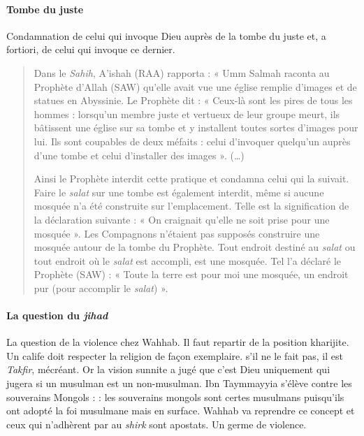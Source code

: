 \paragraph{Tombe du juste}
Condamnation de celui qui invoque Dieu
auprès de la tombe du juste et, a fortiori, de celui qui invoque ce
dernier.
\begin{Ex}
\begin{quote}
Dans le \emph{Sahih}, A'ishah (RAA) rapporta : « Umm Salmah raconta au
Prophète d'Allah (SAW) qu'elle avait vue une église remplie d'images et
de statues en Abyssinie. Le Prophète dit : « Ceux-là sont les pires de
tous les hommes : lorsqu'un membre juste et vertueux de leur groupe
meurt, ils bâtissent une église sur sa tombe et y installent toutes
sortes d'images pour lui. Ils sont coupables de deux méfaits : celui
d'invoquer quelqu'un auprès d'une tombe et celui d'installer des images
». (\ldots)

Ainsi le Prophète interdit cette pratique et condamna celui qui la
suivait. Faire le \emph{salat} sur une tombe est également interdit,
même si aucune mosquée n'a été construite sur l'emplacement. Telle est
la signification de la déclaration suivante : « On craignait qu'elle ne
soit prise pour une mosquée ». Les Compagnons n'étaient pas supposés
construire une mosquée autour de la tombe du Prophète. Tout endroit
destiné au \emph{salat} ou tout endroit où le \emph{salat} est accompli,
est une mosquée. Tel l'a déclaré le Prophète (SAW) : « Toute la terre
est pour moi une mosquée, un endroit pur (pour accomplir le
\emph{salat}) ».
\end{quote}

\end{Ex}


  \paragraph{La question du \emph{jihad}} La question de la violence chez Wahhab. Il faut repartir de la position kharijite. Un calife doit respecter la religion de façon exemplaire. s'il ne le fait pas, il est \emph{Takfir}, mécréant. Or la vision sunnite a jugé que c'est Dieu uniquement qui jugera si un musulman est un non-musulman. Ibn Taymmayyia s'élève contre les souverains Mongols : : les souverains mongols sont certes musulmans puisqu'ils ont adopté la foi musulmane mais en surface.  Wahhab va reprendre ce concept et ceux qui n'adhèrent par au \emph{shirk} sont apostats. Un germe de violence.
  
